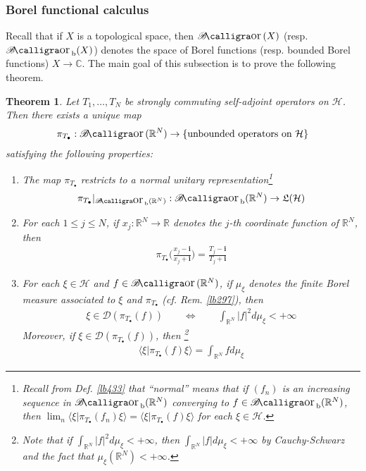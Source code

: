 \documentclass[12pt,b5paper,notitlepage]{article}
\theoremstyle{definition}
\theoremstyle{plain}
\newtheorem{thm}[df]{Theorem}
\DeclareMathOperator{\Bor}{\mathscr{B}\text{\kern -2pt {\calligra\large or}}\,}
\DeclareMathOperator{\Borb}{{\mathscr{B}\text{\kern -2pt {\calligra\large or}}\,}_{\mathrm b}}
\newcommand{\fk}{\mathfrak}
\newcommand{\Dom}{\mathscr{D}}
\newcommand{\bk}[1]{\langle {#1}\rangle}
\newcommand{\im}{\mathbf{i}}
\newcommand{\blt}{\bullet}
\newcommand{\Cbb}{\mathbb C}
\newcommand{\Rbb}{\mathbb R}
\newcommand{\MH}{\mathcal H}
\numberwithin{equation}{section}
\begin{document}
\subsubsection{Borel functional calculus}


Recall that if $X$ is a topological space, then $\Bor(X)$ (resp. $\Borb(X)$) denotes the space of Borel functions (resp. bounded Borel functions) $X\rightarrow\Cbb$. The main goal of this subsection is to prove the following theorem.

\begin{thm}\label{lb434}
Let $T_1,\dots,T_N$ be strongly commuting self-adjoint operators on $\MH$. Then there exists a unique map
\begin{align*}
\pi_{T_\blt}:\Bor(\Rbb^N)\rightarrow\{\text{unbounded operators on }\MH\}
\end{align*}
satisfying the following properties:
\begin{enumerate}[label=(\arabic*)]
\item The map $\pi_{T_\blt}$ restricts to a normal unitary representation\footnote{Recall from Def. \ref{lb433} that ``normal'' means that if $(f_n)$ is an increasing sequence in $\Borb(\Rbb^N)$ converging to $f\in\Borb(\Rbb^N)$, then $\lim_n\bk{\xi|\pi_{T_\blt}(f_n)\xi}=\bk{\xi|\pi_{T_\blt}(f)\xi}$ for each $\xi\in\MH$.}
\begin{align*}
\pi_{T_\blt}|_{\Borb(\Rbb^N)}:\Borb(\Rbb^N)\rightarrow\fk L(\MH)
\end{align*}
\item For each $1\leq j\leq N$, if $x_j:\Rbb^N\rightarrow\Rbb$ denotes the $j$-th coordinate function of $\Rbb^N$, then
\begin{align*}
\pi_{T_\blt}\Big(\frac{x_j-\im}{x_j+\im}\Big)=\frac{T_j-\im}{T_j+\im}
\end{align*}
\item For each $\xi\in\MH$ and $f\in\Bor(\Rbb^N)$, if $\mu_\xi$ denotes the finite Borel measure associated to $\xi$ and $\pi_{T_\blt}$ (cf. Rem. \ref{lb297}), then
\begin{align}
\xi\in\Dom(\pi_{T_\blt}(f))\qquad\Longleftrightarrow\qquad \int_{\Rbb^N} |f|^2d\mu_\xi<+\infty
\end{align}
Moreover, if $\xi\in\Dom(\pi_{T_\blt}(f))$, then \footnote{Note that if $\int_{\Rbb^N} |f|^2d\mu_\xi<+\infty$, then $\int_{\Rbb^N} |f|d\mu_\xi<+\infty$ by Cauchy-Schwarz and the fact that $\mu_\xi(\Rbb^N)<+\infty$.}
\begin{align}
\bk{\xi|\pi_{T_\blt}(f)\xi}=\int_{\Rbb^N}fd\mu_\xi
\end{align}
\end{enumerate}
\end{thm}
\end{document}
